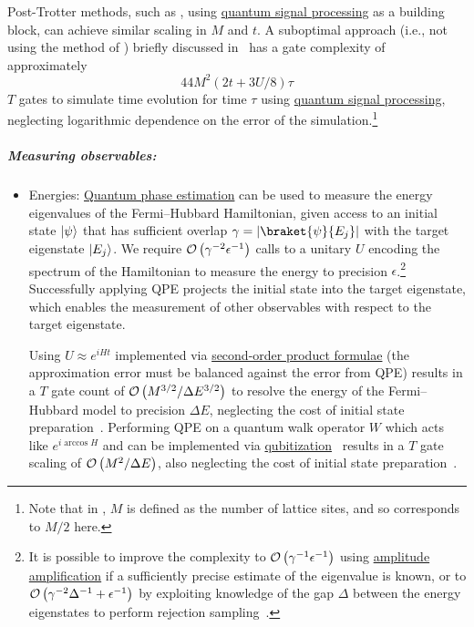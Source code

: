 \begin{refsection}
\begin{itemize}
    Post-Trotter methods, such as \cite{haah2018QAlgSimLatticeHam}, using \hyperref[prim:QSPqubitization]{quantum signal processing} as a building block, can achieve similar scaling in $M$ and $t$. A suboptimal approach (i.e., not using the method of \cite{haah2018QAlgSimLatticeHam}) briefly discussed in~\cite{flannigan2022} has a gate complexity of approximately 
    \begin{equation}
        44 M^2 (2t + 3U/8)\tau
    \end{equation}
    $T$ gates to simulate time evolution for time $\tau$ using \hyperref[prim:QSPqubitization]{quantum signal processing}, neglecting logarithmic dependence on the error of the simulation.\footnote{Note that in \cite{flannigan2022}, $M$ is defined as the number of lattice sites, and so corresponds to $M/2$ here.}
\end{itemize}





\subparagraph{Measuring observables:} 
\begin{itemize}
    \item Energies: \hyperref[prim:QPE]{Quantum phase estimation} can be used to measure the energy eigenvalues of the Fermi--Hubbard Hamiltonian, given access to an initial state $\lvert\psi\rangle$ that has sufficient overlap $\gamma = |\braket{\psi}{E_j}|$ with the target eigenstate $\lvert E_j\rangle$. We require $\mathcal{O}\left( \gamma^{-2} \epsilon^{-1} \right)$ calls to a unitary $U$ encoding the spectrum of the Hamiltonian to measure the energy to precision $\epsilon$.\footnote{It is possible to improve the complexity to $\mathcal{O}\left( \gamma^{-1} \epsilon^{-1} \right)$ using \hyperref[prim:AA]{amplitude amplification} if a sufficiently precise estimate of the eigenvalue is known, or to $\mathcal{O}\left( \gamma^{-2} \Delta^{-1} + \epsilon^{-1} \right)$ by exploiting knowledge of the gap $\Delta$ between the energy eigenstates to perform rejection sampling~\cite{berry2018ImprovedEigenstatesFermionic}.} Successfully applying QPE projects the initial state into the target eigenstate, which enables the measurement of other observables with respect to the target eigenstate.

    Using $U \approx e^{iHt}$ implemented via \hyperref[prim:ProductFormulae]{second-order product formulae} (the approximation error must be balanced against the error from QPE) results in a $T$ gate count of $\mathcal{O}\left( M^{3/2}/\Delta E^{3/2} \right)$ to resolve the energy of the Fermi--Hubbard model to precision $\Delta E$, neglecting the cost of initial state preparation~\cite{Kivlichan2020ImprovedFaultTolerantSimulationCondensedMatter,CampbellHubbard22}. Performing QPE on a quantum walk operator $W$ which acts like $e^{i\arccos{H}}$ and can be implemented via \hyperref[prim:Qubitization]{qubitization}~\cite{poulin2018SpectralQubitization,berry2018ImprovedEigenstatesFermionic} results in a $T$ gate scaling of $\mathcal{O}\left( M^2/\Delta E \right)$, also neglecting the cost of initial state preparation~\cite{babbush2018EncodingElectronicSpectraLinearT}.
        

\end{itemize}
\end{refsection}
